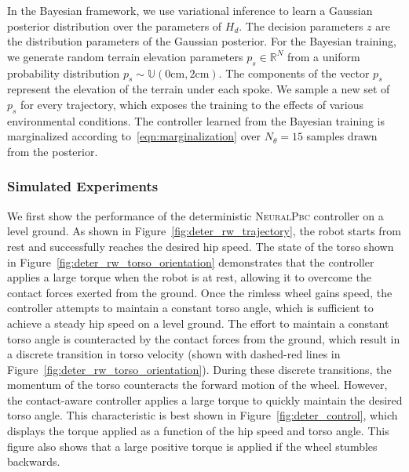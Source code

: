 In the Bayesian framework, we use variational inference to learn a Gaussian
posterior distribution over the parameters of $H_d$.
%
The decision parameters $z$ are the distribution parameters of the Gaussian
posterior.
%
For the Bayesian training, we generate random terrain elevation parameters $p_s
\in \mathbb{R}^N$ from a uniform probability distribution $p_s \sim
\mathbb{U}(0 \textrm{cm}, 2\textrm{cm})$.
%
The components of the vector $p_s$ represent the elevation of the terrain under
each spoke.
%
We sample a new set of $p_s$ for every trajectory, which exposes the training to
the effects of various environmental conditions.
%
The controller learned from the Bayesian training is marginalized according
to~\eqref{eqn:marginalization} over $N_\theta = 15$ samples drawn from the
posterior. 


\subsubsection{Simulated Experiments}


We first show the performance of the deterministic \textsc{NeuralPbc} controller
on a level ground.
%
As shown in Figure~\ref{fig:deter_rw_trajectory}, the robot starts from rest and
successfully reaches the desired hip speed.
%
The state of the torso shown in Figure~\ref{fig:deter_rw_torso_orientation}
demonstrates that the controller applies a large torque when the robot is at
rest, allowing it to overcome the contact forces exerted from the ground.
%
Once the rimless wheel gains speed, the controller attempts to maintain a constant
torso angle, which is sufficient to achieve a steady hip speed on a level ground.  
%
The effort to maintain a constant torso angle is counteracted by the contact
forces from the ground, which result in a discrete transition in torso velocity
(shown with dashed-red lines in Figure~\ref{fig:deter_rw_torso_orientation}).
%
During these discrete transitions, the momentum of the torso
counteracts the forward motion of the wheel.
%
However, the contact-aware controller applies a large torque to quickly maintain
the desired torso angle.
%
This characteristic is best shown in Figure~\ref{fig:deter_control}, which
displays the torque applied as a function of the hip speed and torso angle. 
%
This figure also shows that a large positive torque is applied if the wheel
stumbles backwards.
%

